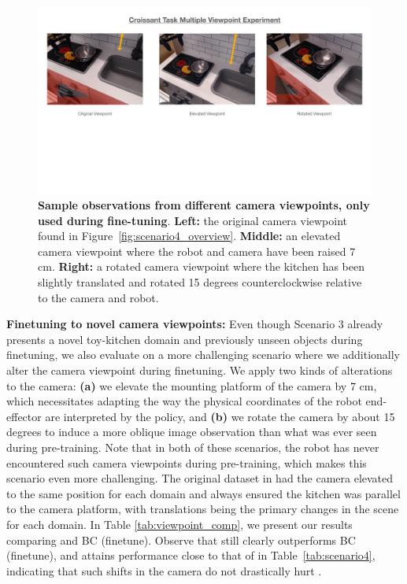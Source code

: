 \documentclass[conference]{IEEEtran}
\begin{document}
\begin{figure}[h]
\vspace{-0.3cm}
\centering
  \includegraphics[width=0.9\linewidth]{MultViewpoint.pdf}
  \vspace{-0.3cm}
  \caption{\footnotesize \textbf{Sample observations from different camera viewpoints, only used during fine-tuning}. \textbf{Left:} the original camera viewpoint found in Figure~\ref{fig:scenario4_overview}. \textbf{Middle:} an elevated camera viewpoint where the robot and camera have been raised 7 cm. \textbf{Right:} a rotated camera viewpoint where the kitchen has been slightly translated and rotated 15 degrees counterclockwise relative to the camera and robot.}
  \label{fig:multviewpoint}
  \vspace{-0.2cm}
\end{figure}

\textbf{Finetuning to novel camera viewpoints:} Even though Scenario 3 already presents a novel toy-kitchen domain and previously unseen objects during finetuning, we also evaluate \methodname on a more challenging scenario where we additionally alter the camera viewpoint during finetuning. We apply two kinds of alterations to the camera: \textbf{(a)} we elevate the mounting platform of the camera by 7 cm, which necessitates adapting the way the physical coordinates of the robot end-effector are interpreted by the policy, and \textbf{(b)} we rotate the camera by about 15 degrees to induce a more oblique image observation than what was ever seen during pre-training. Note that in both of these scenarios, the robot has never encountered such camera viewpoints during pre-training, which makes this scenario even more challenging. The original dataset in \citep{ebert2021bridge} had the camera elevated to the same position for each domain and always ensured the kitchen was parallel to the camera platform, with translations being the primary changes in the scene for each domain. In Table \ref{tab:viewpoint_comp}, we present our results comparing \methodname and BC (finetune). Observe that \methodname still clearly outperforms BC (finetune), and attains performance close to that of \methodname in Table~\ref{tab:scenario4}, indicating that such shifts in the camera do not drastically hurt \methodname.
\end{document}
